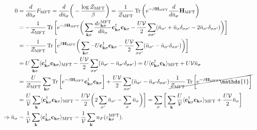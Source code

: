 \documentclass{homework}
\begin{document}
\begin{align*}
    0 &= \frac{d}{d \bar{n}_{\sigma}} F_{\textnormal{MFT}} = \frac{d}{d \bar{n}_{\sigma}} \bigg( - \frac{\log \mathcal{Z}_{\textnormal{MFT}}}{\beta} \bigg) = \frac{1}{\mathcal{Z}_{\textnormal{MFT}}} \Tr \bigg(e^{-\beta {\bf H}_{\textnormal{MFT}}} \frac{d}{d\bar{n}_{\sigma}} {\bf H}_{\textnormal{MFT}} \bigg) \\
    &= - \frac{1}{\mathcal{Z}_{\textnormal{MFT}}} \Tr \bigg[e^{-\beta {\bf H}_{\textnormal{MFT}}} \bigg(\sum_{{\bf k}\sigma} \frac{d \varepsilon_{{\bf k} \sigma}^{\textnormal{MFT}}}{d \bar{n}_{\sigma}} {\bf c}_{{\bf k}\sigma}^\dagger {\bf c}_{{\bf k}\sigma} - \frac{U  \mathcal{V}}{2} \sum_{\sigma \sigma'} ({\bar n}_{\sigma'} + \bar{n}_{\sigma} \delta_{\sigma \sigma'} -2 \bar{n}_{\sigma'} \delta_{\sigma \sigma'} ) \bigg) \bigg] \\
    &= - \frac{1}{\mathcal{Z}_{\textnormal{MFT}}} \Tr \bigg[e^{\beta {\bf H}_{\textnormal{MFT}}} \bigg(\sum_{{\bf k}\sigma} -U {\bf c}_{{\bf k}\sigma}^\dagger {\bf c}_{{\bf k}\sigma}  - \frac{U  \mathcal{V}}{2} \sum_{\sigma \sigma'} ({\bar n}_{\sigma'} - \bar{n}_{\sigma'} \delta_{\sigma \sigma'} ) \bigg) \bigg] \\
    &= U \sum_{{\bf k} \sigma} \langle {\bf c}_{{\bf k}\sigma}^\dagger {\bf c}_{{\bf k}\sigma} \rangle_{\textnormal{MFT}} - \frac{U  \mathcal{V}}{2} \sum_{\sigma \sigma'} ({\bar n}_{\sigma'} - \bar{n}_{\sigma'} \delta_{\sigma \sigma'} ) =  U \langle {\bf c}_{{\bf k}\sigma}^\dagger {\bf c}_{{\bf k}} \rangle_{\textnormal{MFT}} + U \mathcal{V} \bar{n}_{\sigma} \\
    &= \frac{U}{\mathcal{Z}_{\textnormal{MFT}}} \sum_{{\bf k} \sigma} \Tr \bigg[e^{-\beta {\bf H}_{\textnormal{MFT}}} {\bf c}_{{\bf k}\sigma}^\dagger {\bf c}_{{\bf k}\sigma} \bigg] + \frac{U  \mathcal{V}}{2} \sum_{\sigma \sigma'} ({\bar n}_{\sigma'} - \bar{n}_{\sigma'} \delta_{\sigma \sigma'}) \cancel{\frac{1}{\mathcal{Z}_{\textnormal{MFT}}} \Tr \bigg[e^{-\beta {\bf H}_{\textnormal{MFT}}} \mathds{1} \bigg]} \\
    &= \frac{U}{\mathcal{V}} \sum_{{\bf k}} \langle {\bf c}_{{\bf k}\sigma}^\dagger {\bf c}_{{\bf k}\sigma} \rangle_{\textnormal{MFT}} - \frac{U \mathcal{V}}{2} \bigg( 2 \sum_{\sigma'} {\bar n}_{\sigma'} - \sum_{\sigma} {\bar n}_{\sigma} \bigg) \bigg] =  \sum_{\sigma} \bigg[ \sum_{{\bf k}} \frac{U}{\mathcal{V}} \langle {\bf c}_{{\bf k}\sigma}^\dagger {\bf c}_{{\bf k}\sigma} \rangle_{\textnormal{MFT}} + \frac{U \mathcal{V}}{2} {\bar{ n}_{\sigma}} \bigg]\\
    \Rightarrow \bar{n}_{\sigma} &= \frac{1}{\mathcal{V}} \sum_{{\bf k}} \langle {\bf c}_{{\bf k}\sigma}^\dagger {\bf c}_{{\bf k}\sigma} \rangle_{\textnormal{MFT}} = \frac{1}{\mathcal{V}} \sum_{{\bf k}} n_F(\varepsilon_{{\bf k} \sigma}^{\textnormal{MFT}}).
\end{align*}
\end{document}
